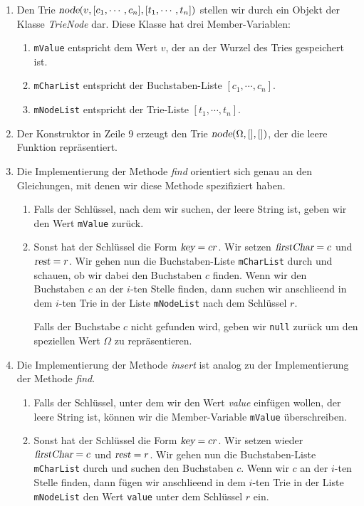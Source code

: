 \begin{enumerate}
\item Den Trie $\textsl{node}(v, [c_1,\cdots,c_n], [t_1,\cdots,t_n])$ stellen wir durch ein Objekt der Klasse
      \textsl{TrieNode} dar.  Diese Klasse hat drei Member-Variablen:
      \begin{enumerate}
      \item \texttt{mValue} entspricht dem Wert $v$, der an der Wurzel des Tries
             gespeichert ist.
      \item \texttt{mCharList} entspricht der Buchstaben-Liste $[c_1,\cdots,c_n]$.
      \item \texttt{mNodeList} entspricht der Trie-Liste $[t_1,\cdots,t_n]$.
      \end{enumerate}
\item Der Konstruktor in Zeile 9 erzeugt den Trie $\textsl{node}(\Omega, [], [])$, der die
      leere Funktion repr\"asentiert.
\item Die Implementierung der Methode \textsl{find} orientiert sich genau an den Gleichungen, 
      mit denen wir diese Methode spezifiziert haben.
      \begin{enumerate}
      \item Falls der Schl\"ussel, nach dem wir suchen, der leere String ist,
            geben wir den Wert \texttt{mValue} zur\"uck.
      \item Sonst hat der Schl\"ussel die Form $\textsl{key} = cr$. Wir setzen
            $\textsl{firstChar} = c$ und $\textsl{rest} = r$.  Wir gehen nun die
            Buchstaben-Liste \texttt{mCharList} durch und schauen, ob wir 
            dabei den Buchstaben $c$ finden.  Wenn  wir den Buchstaben $c$ an der $i$-ten
            Stelle finden, dann suchen wir anschlie\3end  in dem $i$-ten Trie in der Liste 
            \texttt{mNodeList} nach dem Schl\"ussel $r$.

            Falls der Buchstabe $c$ nicht gefunden wird, geben wir \texttt{null} zur\"uck um
            den speziellen Wert $\Omega$ zu repr\"asentieren.
      \end{enumerate}
\item Die Implementierung der Methode \textsl{insert} ist analog zu der Implementierung
      der Methode \textsl{find}.
      \begin{enumerate}
      \item Falls der Schl\"ussel, unter dem wir den Wert \textsl{value} einf\"ugen wollen, der
            leere String ist, k\"onnen  wir die Member-Variable \texttt{mValue} \"uberschreiben.
      \item Sonst hat der Schl\"ussel die Form $\textsl{key} = cr$. Wir setzen wieder
            $\textsl{firstChar} = c$ und $\textsl{rest} = r$.  Wir gehen nun die
            Buchstaben-Liste \texttt{mCharList} durch und suchen den Buchstaben $c$.  
            Wenn wir $c$ an der $i$-ten
            Stelle finden, dann f\"ugen wir anschlie\3end  in dem $i$-ten Trie in der Liste 
            \texttt{mNodeList} den Wert \texttt{value} unter dem Schl\"ussel $r$ ein.


\end{enumerate}
\end{enumerate}
